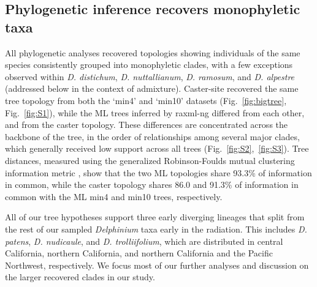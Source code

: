 \documentclass[11pt]{article}
\begin{document}
\subsection{Phylogenetic inference recovers monophyletic taxa}
All phylogenetic analyses recovered topologies showing individuals of the same 
species consistently grouped into monophyletic clades, with a few exceptions 
observed within \emph{D. distichum}, \emph{D. nuttallianum}, \emph{D. ramosum}, and 
\emph{D. alpestre} (addressed below in the context of admixture).
% 
Caster-site recovered the same tree topology from both the `min4' and `min10' 
datasets (Fig.~\ref{fig:bigtree}, Fig.~\ref{fig:S1}), while the ML trees
inferred by raxml-ng differed from each other, and from the caster topology.
% 
These differences are concentrated across the backbone of the tree, in the 
order of relationships among several major clades, which generally received
low support across all trees
(Fig.~\ref{fig:S2},~\ref{fig:S3}).
% 
Tree distances, measured using the generalized Robinson-Foulds mutual clustering
information metric \citep[MCI;][]{smith_information_2020}, show that the two
ML topologies share 93.3\% of information in common, while the caster topology
shares 86.0 and 91.3\% of information in common with the ML min4 and min10 
trees, respectively.

All of our tree hypotheses support three early diverging lineages that split
from the rest of our sampled \emph{Delphinium} taxa early in the radiation. 
This includes \emph{D. patens}, \emph{D. nudicaule}, and \emph{D. trolliifolium},
which are distributed in central California, northern California, and northern 
California and the Pacific Northwest, respectively. 
We focus most of our further
analyses and discussion on the larger recovered clades in our study.
\end{document}
